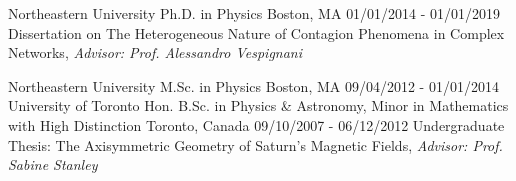 \vspace{-2mm}
\begin{cventries}

  \cveducationentry
    {Northeastern University} %
    {Ph.D. in Physics} %
    {Boston, MA} %
    {01/01/2014 - 01/01/2019} %
    {Dissertation on The Heterogeneous Nature of Contagion Phenomena in  Complex Networks,  \textit{Advisor: Prof. Alessandro Vespignani}}
    

  \cveducationentry
    {Northeastern University} %
    {M.Sc. in Physics} %
    {Boston, MA} %
    {09/04/2012 - 01/01/2014} %
   	{}
\vspace{-1mm}
  \cveducationentry
    {University of Toronto} %
    {Hon. B.Sc. in Physics \& Astronomy, Minor in Mathematics with High Distinction} %
    {Toronto, Canada} %
    {09/10/2007 - 06/12/2012} %
    {Undergraduate Thesis: The Axisymmetric Geometry of Saturn's Magnetic Fields,  \textit{Advisor: Prof. Sabine Stanley}}


\end{cventries}
